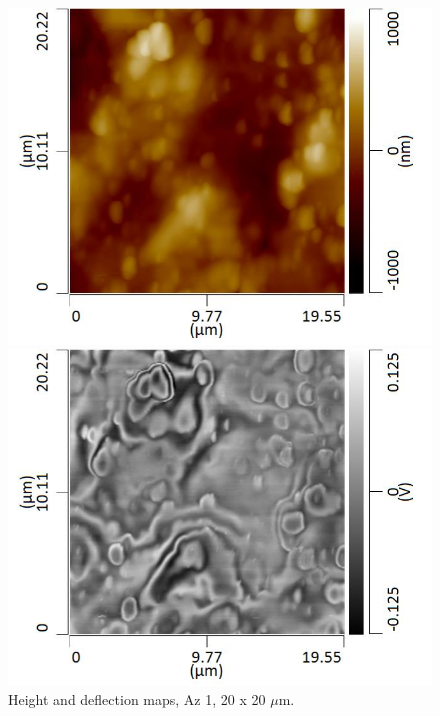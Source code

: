 \begin{figure}[H]
\centering
\begin{minipage}{.45\textwidth}
  \centering
  \includegraphics[width=\linewidth]{Az1_tapping_mode_240521_height_7}
\end{minipage}
\begin{minipage}{.45\textwidth}
  \centering
  \includegraphics[width=\linewidth]{Az1_tapping_mode_240521_def_7}
\end{minipage}
\caption[Height and deflection maps, Az 1]{Height and deflection maps, Az 1, 20 x 20 $\mu$m.}
\label{fig:afm_az1_height_def_7}
\end{figure}

